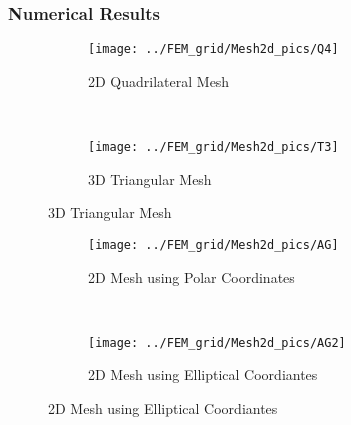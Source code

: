 \begin{frame} \frametitle{Numerical Results}
	\begin{figure}
        \centering
        \begin{subfigure}[b]{0.45\textwidth}
                \centering
                \texttt{[image: ../FEM\_grid/Mesh2d\_pics/Q4]}
                \caption{2D Quadrilateral Mesh}
                \label{fig:Q4}
        \end{subfigure}%
				~ %
        \begin{subfigure}[b]{0.45\textwidth}
                \centering
                \texttt{[image: ../FEM\_grid/Mesh2d\_pics/T3]}
                \caption{3D Triangular Mesh}
                \label{fig:T3}
				\end{subfigure}
				\label{fig:myCFD_meshes}
	\end{figure}
\end{frame}

\begin{frame}
	\begin{figure}
        \centering
        \begin{subfigure}[b]{0.45\textwidth}
                \centering
                \texttt{[image: ../FEM\_grid/Mesh2d\_pics/AG]}
                \caption{2D Mesh using Polar Coordinates}
                \label{fig:PolarCoordiantesMesh}
        \end{subfigure}%
				~ %
        \begin{subfigure}[b]{0.45\textwidth}
                \centering
                \texttt{[image: ../FEM\_grid/Mesh2d\_pics/AG2]}
                \caption{2D Mesh using Elliptical Coordiantes}
                \label{fig:EllipticalCoordiantesMesh}
				\end{subfigure}
				\label{fig:AnalyticCoordiantes}
	\end{figure}
\end{frame}

